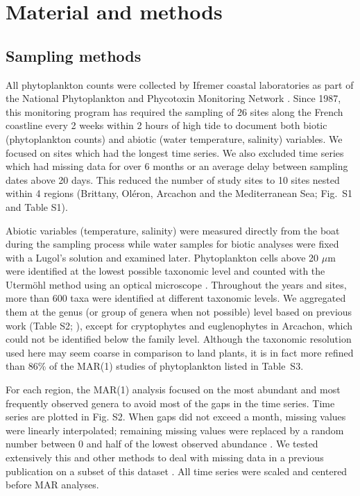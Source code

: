 \documentclass[10pt]{article}
\begin{document}
\section*{Material and methods}

\subsection*{Sampling methods}

All phytoplankton counts were collected by Ifremer coastal laboratories
as part of the National Phytoplankton and Phycotoxin Monitoring Network
\citep{REPHY_db}. Since 1987, this monitoring program has required
the sampling of 26 sites along the French coastline every 2 weeks
within 2 hours of high tide to document both biotic (phytoplankton
counts) and abiotic (water temperature, salinity) variables. We focused
on sites which had the longest time series. We also excluded time
series which had missing data for over 6 months or an average delay
between sampling dates above 20 days. This reduced the number of study
sites to 10 sites nested within 4 regions (Brittany, Oléron, Arcachon
and the Mediterranean Sea; Fig.~S1 and Table S1).

Abiotic variables (temperature, salinity) were measured directly from
the boat during the sampling process while water samples for biotic
analyses were fixed with a Lugol's solution and examined later. Phytoplankton
cells above 20 $\mu$m were identified at the lowest possible taxonomic
level and counted with the Utermöhl method using an optical microscope
\citep{utermohl_zur_1958}. Throughout the years and sites, more than
600 taxa were identified at different taxonomic levels. We aggregated
them at the genus (or group of genera when not possible) level based
on previous work (Table S2; \citealt{hernandez_farinas_assessing_2015,barraquand_coastal_2018}),
except for cryptophytes and euglenophytes in Arcachon, which could
not be identified below the family level. Although the taxonomic resolution
used here may seem coarse in comparison to land plants, it is in fact
more refined than 86\% of the MAR(1) studies of phytoplankton listed
in Table~S3.

For each region, the MAR(1) analysis focused on the most abundant
and most frequently observed genera to avoid most of the gaps in the
time series. Time series are plotted in Fig. S2. When gaps did not
exceed a month, missing values were linearly interpolated; remaining
missing values were replaced by a random number between 0 and half
of the lowest observed abundance \citep{hampton_coalescence_2006}.
We tested extensively this and other methods to deal with missing
data in a previous publication on a subset of this dataset \citep{barraquand_coastal_2018}.
All time series were scaled and centered before MAR analyses.
\end{document}
